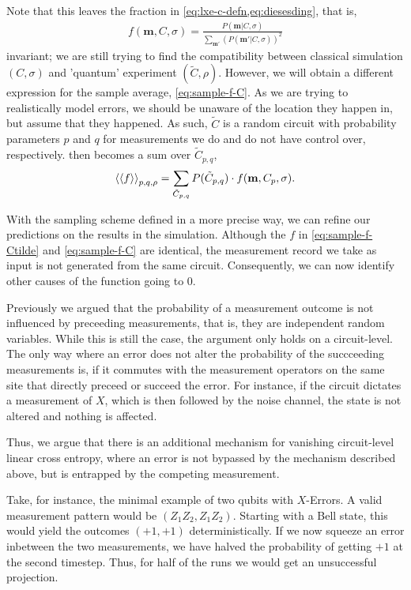 Note that this leaves the fraction in \cref{eq:lxe-c-defn,eq:diesesding}, that
is,
\begin{align}
      f(\mathbf{m}, C, \sigma) = \frac{P(\mathbf{m} |
     C,\sigma)}{\sum_{\mathbf{m'}}\left(P(\mathbf{m}'|C,\sigma)\right)^2}
\end{align}
invariant;
we are still trying to find the compatibility
between classical simulation $(C, \sigma)$ and 'quantum' experiment
$(\tilde{C}, \rho)$.  However, we will obtain a different expression for the
sample average, \cref{eq:sample-f-C}. As we are trying to realistically
model errors, we should be unaware of the location they happen in, but assume
that they happened. As such, $\tilde{C}$ is a random circuit with probability
parameters $p$ and $q$ for measurements we do and do not have control over, respectively.
 then becomes a sum over $\tilde{C}_{p,q}$,
\begin{align}
  \label{eq:sample-f-Ctilde} \expval{\expval{f}}_{p,q,\rho} =
\sum_{\tilde{C}_{p,q}} P(\tilde{C}_{p,q}) \cdot f(\mathbf{m},C_p, \sigma)
.\end{align}

With the sampling scheme defined in a more precise way, we can refine our
predictions on the results in the simulation. Although the $f$ in \cref{eq:sample-f-Ctilde} and \cref{eq:sample-f-C} are
identical, the measurement record we take as input is not generated from the
same circuit. Consequently, we can now identify other
causes of the function going to $0$.

Previously we argued that the probability of a
measurement outcome is not influenced by preceeding measurements, that is, they
are independent random variables. While this is still the case, the argument
only holds on a circuit-level. The only way where an error does not alter the
probability of the succceeding measurements is, if it commutes with the
measurement operators on the same site that directly preceed or succeed the
error. For instance, if the circuit dictates a measurement of $X$, which is
then followed by the noise channel, the state is not altered and nothing is
affected.

Thus, we argue that there is an additional mechanism for vanishing
circuit-level linear cross entropy, where an error is not bypassed by the
mechanism described above, but is entrapped by the competing measurement.

Take, for instance, the minimal example of two qubits with $X$-Errors.
A valid measurement pattern would be $(Z_1Z_2, Z_1Z_2)$. Starting with a
Bell state, this would yield the outcomes $(+1, +1)$ deterministically. If
we now squeeze an error inbetween the two measurements, we have halved the
probability of getting $+1$ at the second timestep. Thus, for half of the runs
we would get an unsuccessful projection. 


